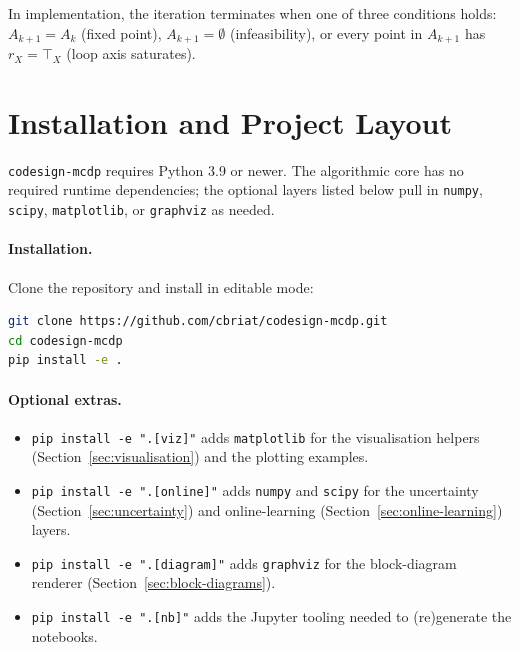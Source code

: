 \documentclass[11pt,a4paper]{article}
\newcommand{\topp}{\top}
\newcommand{\codename}{\texttt{codesign-mcdp}}
\begin{document}
In implementation, the iteration terminates when one of three
conditions holds: $A_{k+1} = A_k$ (fixed point), $A_{k+1} = \emptyset$
(infeasibility), or every point in $A_{k+1}$ has $r_X = \topp_X$
(loop axis saturates).

\section{Installation and Project Layout}
\label{sec:install}

\codename{} requires Python 3.9 or newer. The algorithmic core has no
required runtime dependencies; the optional layers listed below pull in
\texttt{numpy}, \texttt{scipy}, \texttt{matplotlib}, or \texttt{graphviz}
as needed.

\paragraph{Installation.} Clone the repository and install in editable
mode:
\begin{lstlisting}[language=bash]
git clone https://github.com/cbriat/codesign-mcdp.git
cd codesign-mcdp
pip install -e .
\end{lstlisting}

\paragraph{Optional extras.}
\begin{itemize}[leftmargin=2em]
  \item \texttt{pip install -e ".[viz]"} adds \texttt{matplotlib} for the
        visualisation helpers (Section~\ref{sec:visualisation}) and the
        plotting examples.
  \item \texttt{pip install -e ".[online]"} adds \texttt{numpy} and
        \texttt{scipy} for the uncertainty
        (Section~\ref{sec:uncertainty}) and online-learning
        (Section~\ref{sec:online-learning}) layers.
  \item \texttt{pip install -e ".[diagram]"} adds \texttt{graphviz} for
        the block-diagram renderer (Section~\ref{sec:block-diagrams}).
  \item \texttt{pip install -e ".[nb]"} adds the Jupyter tooling needed
        to (re)generate the notebooks.
\end{itemize}
\end{document}
